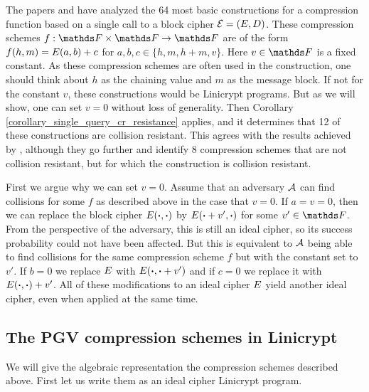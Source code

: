 The papers \cite{C:BlaRogShr02} and \cite{C:PreGovVan93} have analyzed the 64 most basic constructions for a compression function
based on a single call to a block cipher $\mathcal{E} = (E, D)$.
These compression schemes $f: \F \times \F \to \F$ are of the form $f(h, m) = E(a, b) + c$ for $a,b,c \in \{h, m, h+m, v\}$.
Here $v \in \F$ is a fixed constant.
As these compression schemes are often used in the \MD construction,
one should think about $h$ as the chaining value and $m$ as the message block.
If not for the constant $v$, these constructions would be Linicrypt programs.
But as we will show, one can set $v=0$ without loss of generality.
Then Corollary \ref{corollary_single_query_cr_resistance} applies,
and it determines that 12 of these constructions are collision resistant.
This agrees with the results achieved by \cite{C:BlaRogShr02},
although they go further and identify 8 compression schemes that are not collision resistant,
but for which the \MD construction is collision resistant.

First we argue why we can set $v=0$.
Assume that an adversary $\mathcal{A}$ can find collisions for some $f$ as described above in the case that $v=0$.
If $a = v = 0$, then we can replace the block cipher $E(\boldsymbol\cdot, \boldsymbol\cdot)$ by $E(\boldsymbol\cdot + v', \boldsymbol\cdot)$ for some $v' \in \F$.
From the perspective of the adversary,
this is still an ideal cipher,
so its success probability could not have been affected.
But this is equivalent to $\mathcal{A}$ being able to find collisions for the same compression scheme $f$ but with the constant set to $v'$.
If $b=0$ we replace $E$ with $E(\boldsymbol\cdot, \boldsymbol\cdot + v')$ and if $c=0$ we replace it with $E(\boldsymbol\cdot, \boldsymbol\cdot) + v'$.
All of these modifications to an ideal cipher $E$ yield another ideal cipher,
even when applied at the same time.

\subsection{The PGV compression schemes in Linicrypt}
We will give the algebraic representation the compression schemes described above.
First let us write them as an ideal cipher Linicrypt program. 

